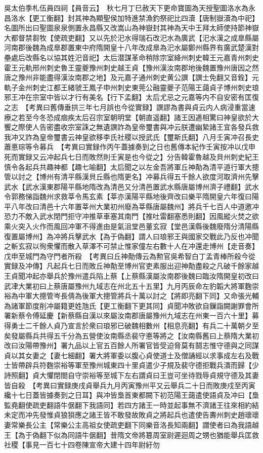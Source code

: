 吳太伯季札伍員四祠【員音云】　秋七月丁巳赦天下更命寶圖為天授聖圖洛水為永昌洛水【更工衡翻】封其神為顯聖侯加特進禁漁釣祭祀比四瀆【唐制嶽瀆為中祀】名圖所出曰聖圖泉泉側置永昌縣又改嵩山為神嶽封其神為天中王拜太師使持節神嶽大都督禁芻牧【使疏吏翻】又以先於汜水得瑞石改汜水為廣武【汜水漢之成臯縣屬河南郡後魏為成臯郡置東中府隋開皇十八年改成臯為汜水屬鄭州縣界有廣武楚漢對壘處后改縣名以協其姓汜音祀】太后潜謀革命稍除宗室絳州刺史韓王元嘉青州刺史霍王元軌邢州刺史魯王靈夔豫州刺史越王貞【豫州漢汝南郡地後魏置豫州唐因之然唐之豫州非能盡得漢汝南郡之地】及元嘉子通州刺史黄公譔【譔士免翻又音銓】元軌子金州刺史江都王緒虢王鳳子申州刺史東莞公融靈夔子范陽王藹貞子博州刺史琅邪王冲在宗室中皆以才行有美名【行下孟翻】太后尤忌之元嘉等内不自安密有匡復之志　【考異曰舊傳垂拱三年七月誤也今從實録】譔謬為書與貞云内人病浸重當速療之若至今冬恐成痼疾太后召宗室朝明堂【朝直遥翻】諸王因逓相驚曰神皇欲於大饗之際使人告密盡收宗室誅之無遺譔詐為皇帝璽書與冲云朕遭幽縶諸王宜各發兵救我冲又詐為皇帝璽書云神皇欲移李氏社稷以授武氏【璽斯氏翻】八月壬寅冲召長史蕭悳琮等令募兵　【考異曰實録作丙午蓋據奏到之日也舊傳本紀作壬寅按冲以戊申死而實録又云冲起兵七日而敗然則壬寅是也今從之】分告韓霍魯越及貝州刺史紀王慎令各起兵共趣神都【趣七喻翻】太后聞之以左金吾將軍丘神勣為清平道行軍大摠管以討之【博州有清平縣漢貝丘縣也隋更名】冲募兵得五千餘人欲度河取濟州先擊武水【武水漢東郡陽平縣地隋改為清邑又分清邑置武水縣唐屬博州濟子禮翻】武水令郭務悌詣魏州求救莘令馬玄素【莘亦漢陽平縣地後齊改曰樂平隋開皇六年復曰陽平八年改曰清邑十六年置莘州大業初州廢為莘縣唐屬魏州】將兵千七百人中道邀冲恐力不敵入武水閉門拒守冲推草車塞其南門【推吐雷翻塞悉則翻】因風縱火焚之欲乘火突入火作而風回冲軍不得進由是氣沮堂邑董玄寂【堂邑漢縣後魏廢隋分清陽縣復置屬博州】為冲將兵擊武水【為于偽翻】謂人曰琅邪王與國家交戰此乃反也冲聞之斬玄寂以徇衆懼而散入草澤不可禁止惟家僮左右數十人在冲還走博州【走音奏】戊申至城門為守門者所殺　【考異曰丘神勣傳云為勲官吳希智白丁孟青棒所殺今從實録及冲傳】凡起兵七日而敗丘神勣至博州官吏素服出迎神勣盡殺之凡破千餘家越王貞聞冲起亦舉兵於豫州遣兵陷上蔡【上蔡縣漢屬汝南郡後魏曰臨汝隋開皇初改曰武冿大業初曰上蔡唐屬豫州九域志在州北五十五里】九月丙辰命左豹韜大將軍麴崇裕為中軍大摠管岑長倩為後軍大摠管將兵十萬以討之【將即亮翻下同】又命張光輔為諸軍節度削冲屬籍更姓虺氏【更工衡翻下更其同】貞聞冲敗欲自鏁詣闕謝罪會所署新蔡令傅延慶【新蔡縣自漢以來屬汝南郡唐屬豫州九域志在州東一百六十里】募得勇士二千餘人貞乃宣言於衆曰琅邪已破魏相數州【相息亮翻】有兵二十萬朝夕至矣發屬縣兵共得五千分為五營使汝南縣丞裴守悳等將之【汝南縣舊曰上蔡隋大業初改曰汝陽帶豫州】署九品以上官五百餘人所署官皆受迫脅莫有鬪志惟守德與之同謀貞以其女妻之【妻七細翻】署大將軍委以腹心貞使道士及僧誦經以求事成左右及戰士皆帶辟兵符麴崇裕等軍至豫州城東四十里貞遣少子規及裴守德拒戰兵潰而歸【少詩照翻】貞大懼閉閤自守崇裕等至城下左右謂貞曰王豈可坐待戮辱貞規守德及其妻皆自殺　【考異曰實録庚戌貞舉兵九月丙寅豫州平又云舉兵二十日而敗庚戍至丙寅纔十七日蓋皆據奏到之日耳】與冲皆梟首東都闕下初范陽王藹遣使語貞及冲曰【梟監堯翻使疏吏翻語牛倨翻下我語同】若四方諸王一時並起事無不濟諸王往來相約結未定而冲先發惟貞狼狽應之諸王皆不敢發故敗貞之將起兵也遣使告夀州刺史趙瓌瓌妻常樂長公主【常樂公主高祖女使疏吏翻下同樂音洛長知兩翻】謂使者曰為我語越王【為于偽翻下似為同語牛倨翻】昔隋文帝將簒周室尉遲迴周之甥也猶能舉兵匡救社稷【事見一百七十四卷陳宣帝大建十四年尉紆勿